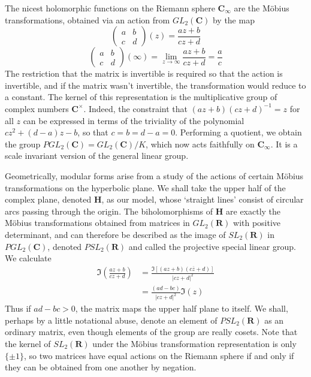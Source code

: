 The nicest holomorphic functions on the Riemann sphere $\mathbf{C}_\infty$ are the M\"{o}bius transformations, obtained via an action from $GL_2(\mathbf{C})$ by the map
%
\[ \begin{pmatrix} a & b \\ c & d \end{pmatrix}(z)  = \frac{az + b}{cz + d} \]
%
\[ \begin{pmatrix} a & b \\ c & d \end{pmatrix}(\infty) = \lim_{z \to \infty } \frac{az + b}{cz + d} = \frac{a}{c} \]
%
The restriction that the matrix is invertible is required so that the action is invertible, and if the matrix wasn't invertible, the transformation would reduce to a constant. The kernel of this representation is the multiplicative group of complex numbers $\mathbf{C}^\times$. Indeed, the constraint that $(az + b)(cz + d)^{-1} = z$ for all $z$ can be expressed in terms of the triviality of the polynomial $cz^2 + (d-a)z - b$, so that $c = b = d-a = 0$. Performing a quotient, we obtain the group $PGL_2(\mathbf{C}) = GL_2(\mathbf{C})/K$, which now acts faithfully on $\mathbf{C}_\infty$. It is a scale invariant version of the general linear group.

Geometrically, modular forms arise from a study of the actions of certain M\"{o}bius transformations on the hyperbolic plane. We shall take the upper half of the complex plane, denoted $\mathbf{H}$, as our model, whose `straight lines' consist of circular arcs passing through the origin. The biholomorphisms of $\mathbf{H}$ are exactly the M\"{o}bius transformations obtained from matrices in $GL_2(\mathbf{R})$ with positive determinant, and can therefore be described as the image of $SL_2(\mathbf{R})$ in $PGL_2(\mathbf{C})$, denoted $PSL_2(\mathbf{R})$ and called the projective special linear group. We calculate
%
\begin{align*}
    \Im \left( \frac{az + b}{cz + d} \right) &= \frac{\Im[(az + b)(c\overline{z} + d)]}{|cz + d|^2}\\
    &= \frac{(ad - bc)}{|cz + d|^2} \Im(z)
\end{align*}
%
Thus if $ad - bc > 0$, the matrix maps the upper half plane to itself. We shall, perhaps by a little notational abuse, denote an element of $PSL_2(\mathbf{R})$ as an ordinary matrix, even though elements of the group are really cosets. Note that the kernel of $SL_2(\mathbf{R})$ under the M\"{o}bius transformation representation is only $\{ \pm 1 \}$, so two matrices have equal actions on the Riemann sphere if and only if they can be obtained from one another by negation.

